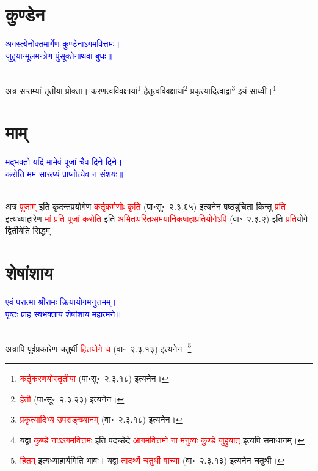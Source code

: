 \section[कुण्डेन]{कुण्डेन}
\centering\textcolor{blue}{अगस्त्येनोक्तमार्गेण कुण्डेनाऽगमवित्तमः।\nopagebreak\\
जुहुयान्मूलमन्त्रेण पुंसूक्तेनाथवा बुधः॥}\nopagebreak\\
\\
\begin{sloppypar}\justifying\noindent\hspace{10mm} अत्र सप्तम्यां तृतीया प्रोक्ता। करणत्व\-विवक्षायां\footnote{\textcolor{red}{कर्तृकरणयोस्तृतीया} (पा॰सू॰~२.३.१८) इत्यनेन।} हेतुत्व\-विवक्षायां\footnote{\textcolor{red}{हेतौ} (पा॰सू॰~२.३.२३) इत्यनेन।} प्रकृत्यादित्वाद्वा\footnote{\textcolor{red}{प्रकृत्यादिभ्य उपसङ्ख्यानम्‌} (वा॰~२.३.१८) इत्यनेन।} इयं साध्वी।\footnote{यद्वा \textcolor{red}{कुण्डे नाऽऽगमवित्तमः} इति पदच्छेदे \textcolor{red}{आगमवित्तमो ना मनुष्यः कुण्डे जुहुयात्‌} इत्यपि समाधानम्।}\end{sloppypar}
\section[माम्]{माम्‌}
\centering\textcolor{blue}{मद्भक्तो यदि मामेवं पूजां चैव दिने दिने।\nopagebreak\\
करोति मम सारूप्यं प्राप्नोत्येव न संशयः॥}\nopagebreak\\
\\
\begin{sloppypar}\justifying\noindent\hspace{10mm} अत्र \textcolor{red}{पूजाम्‌} इति कृदन्त\-प्रयोगेण \textcolor{red}{कर्तृ\-कर्मणोः कृति} (पा॰सू॰~२.३.६५) इत्यनेन षष्ठ्युचिता किन्तु \textcolor{red}{प्रति} इत्यध्याहारेण \textcolor{red}{मां प्रति पूजां करोति} इति \textcolor{red}{अभितः\-परितः\-समया\-निकषा\-हाप्रति\-योगेऽपि} (वा॰~२.३.२) इति \textcolor{red}{प्रति}\-योगे द्वितीयेति सिद्धम्।\end{sloppypar}
\section[शेषांशाय]{शेषांशाय}
\centering\textcolor{blue}{एवं परात्मा श्रीरामः क्रियायोगमनुत्तमम्।\nopagebreak\\
पृष्टः प्राह स्वभक्ताय शेषांशाय महात्मने॥}\nopagebreak\\
\\
\begin{sloppypar}\justifying\noindent\hspace{10mm} अत्रापि पूर्व\-प्रकारेण चतुर्थी \textcolor{red}{हित\-योगे च} (वा॰~२.३.१३) इत्यनेन।\footnote{\textcolor{red}{हितम्} इत्यध्याहार्यमिति भावः। यद्वा \textcolor{red}{तादर्थ्ये चतुर्थी वाच्या} (वा॰~२.३.१३) इत्यनेन चतुर्थी।}\end{sloppypar}

